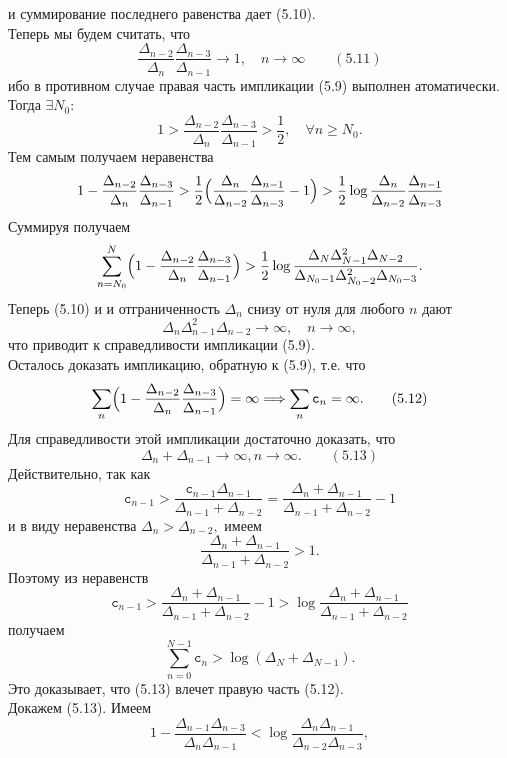 \documentclass[12pt,a4paper]{article}
\theoremstyle{plain}   \newtheorem{Pro}{Задача}
\begin{document}
и суммирование последнего равенства дает (5.10).\\
Теперь мы будем считать, что
$$
  \frac{\Delta _{n-2}}{\Delta _n}
    \frac{\Delta _{n-3}}{\Delta _{n-1}}
	  \longrightarrow 1 , \quad
	    n \rightarrow \infty \qquad (5.11)
$$
ибо в противном случае правая часть импликации (5.9)
выполнен атоматически. Тогда
$ \exists N_0 : $
$$
 1>\frac{\Delta _{n-2}}{\Delta _n}
   \frac{\Delta _{n-3}}{\Delta _{n-1}}>\frac{1}{2},
     \quad \forall n \geqslant N_0 .
$$
Тем самым получаем неравенства
$$
  1-\frac{\Delta _{n-2}}{\Delta _n }
    \frac{\Delta _{n-3}}{\Delta _{n-1}}
	  >\frac{1}{2} \Bigl (
	    \frac{\Delta _n}{\Delta _{n-2}}
		  \frac{\Delta _{n-1}}{\Delta _{n-3}}-1 \Bigr )
		    >\frac{1}{2} \log
			  \frac{\Delta _n}{\Delta _{n-2}}
			    \frac{\Delta _{n-1}}{\Delta _{n-3}}
$$
Суммируя получаем
$$
  \sum _{n=N_0}^N \Bigl (
    1-\frac{\Delta _{n-2}}{\Delta _n}\frac
	  {\Delta _{n-3}}{\Delta _{n-1}} \Bigr ) >
	    \frac{1}{2} \log \frac
		  {\Delta _N \Delta _{N-1}^2 \Delta _{N-2}}
		    {\Delta _{N_0 -1}\Delta _{N_0 -2}^2 \Delta _{N_0 -3}}.
$$
Теперь (5.10) и и отграниченность
$ \Delta _n $
снизу от нуля для любого
$ n $
дают
$$
  \Delta _n \Delta _{n-1}^2 \Delta _{n-2}
    \longrightarrow \infty ,
	  \quad n \rightarrow \infty ,
$$
что приводит к справедливости импликации (5.9). \\
Осталось доказать импликацию, обратную к (5.9), т.е. что
$$
  \sum _n \Bigl ( 1-
    \frac{\Delta _{n-2}}{\Delta _n}
	  \frac{\Delta _{n-3}}{\Delta _{n-1}} \Bigr )
	    =\infty \Longrightarrow \sum _n \mathtt{c}_n =\infty .
		  \qquad (5.12)
$$
Для справедливости этой импликации достаточно доказать, что
$$
  \Delta _n +\Delta _{n-1} \longrightarrow \infty ,
     n \rightarrow \infty . \qquad (5.13)
$$
Действительно, так как
$$
  \mathtt{c}_{n-1}>\frac{\mathtt{c}_{n-1}\Delta _{n-1}}
    {\Delta _{n-1}+\Delta _{n-2}}=
	  \frac{\Delta _n +\Delta _{n-1}}
	    {\Delta _{n-1} +\Delta _{n-2}}-1
$$
и в виду неравенства
$ \Delta _n >\Delta _{n-2} , $
имеем
$$
  \frac{\Delta _n +\Delta _{n-1}}
    {\Delta _{n-1}+\Delta _{n-2}}>1.
$$
Поэтому из неравенств
$$
  \mathtt{c}_{n-1}>
    \frac{\Delta _n +\Delta _{n-1}}
	  {\Delta _{n-1}+\Delta _{n-2}}-1>
	  \log \frac{\Delta _n +\Delta _{n-1}}
	    {\Delta _{n-1}+\Delta _{n-2}}
$$
получаем
$$
  \sum _{n=0}^{N-1}\mathtt{c}_n >
    \log ( \Delta _N +\Delta _{N-1} ) .
$$
Это доказывает, что (5.13) влечет правую часть (5.12).\\
Докажем (5.13). Имеем
$$
  1-\frac{\Delta _{n-1}\Delta _{n-3}}
    {\Delta _n \Delta _{n-1}} <
	  \log \frac{\Delta _n \Delta _{n-1}}
	    {\Delta _{n-2}\Delta _{n-3}},
$$
\end{document}
